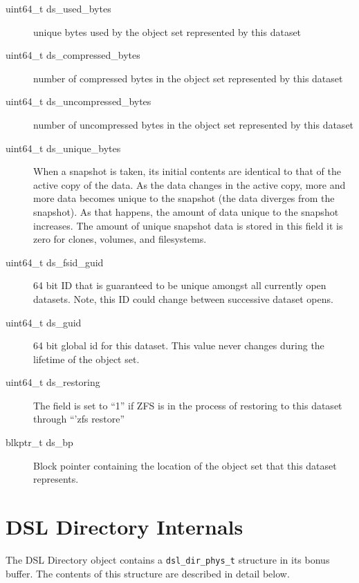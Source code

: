 \begin{description}
\item[uint64\_t ds\_used\_bytes]
  unique bytes used by the object set represented by this dataset

\item[uint64\_t ds\_compressed\_bytes]
  number of compressed bytes in the object set represented by this dataset

\item[uint64\_t ds\_uncompressed\_bytes]
  number of uncompressed bytes in the object set represented by this dataset

\item[uint64\_t ds\_unique\_bytes]
  When a snapshot is taken,
  its initial contents are identical to that of the active copy of the data.
  As the data changes in the active copy,
  more and more data becomes unique to the snapshot
  (the data diverges from the snapshot).
  As that happens, the amount of data unique to the snapshot increases.
  The amount of unique snapshot data is stored in this field
  it is zero for clones, volumes, and filesystems.

\item[uint64\_t ds\_fsid\_guid]
  64 bit ID that is guaranteed to be unique amongst all currently open datasets.
  Note, this ID could change between successive dataset opens.

\item[uint64\_t ds\_guid]
  64 bit global id for this dataset.
  This value never changes during the lifetime of the object set.

\item[uint64\_t ds\_restoring]
  The field is set to ``1'' if ZFS is in the process of
  restoring to this dataset through ``'zfs restore''

\item[blkptr\_t ds\_bp]
  Block pointer containing the location of the object set that this dataset represents.
\end{description}

\section{DSL Directory Internals}\label{sec:dsl_dir_internals}

The DSL Directory object contains a \lstinline{dsl_dir_phys_t} structure in its bonus buffer.
The contents of this structure are described in detail below.

